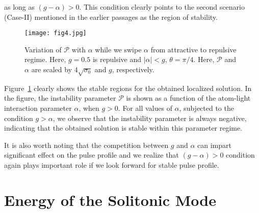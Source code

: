 \documentclass[epj]{svjour}
\begin{document}
as long as $(g-\alpha)>0$. This condition clearly points to the second scenario (Case-II) mentioned in the earlier passages as the region of stability.
\begin{figure}[t]
\centering
\texttt{[image: fig4.jpg]}
\caption{Variation of $\mathcal{P}$ with $\alpha$ while we swipe $\alpha$ from attractive to repulsive regime. Here, $g = 0.5$ is repulsive and $|\alpha|<g$, $\theta=\pi/4$. Here, $\mathcal{P}$ and $\alpha$ are scaled by $4\sqrt{\sigma_{0}}$ and $g$, respectively. }
\label{stability}
\end{figure}
Figure~\ref{stability} clearly shows the stable regions for the obtained localized solution. In the figure, the instability parameter $\mathcal{P}$  is shown as a function of the atom-light interaction parameter $\alpha$, when $g>0$. For all values of $\alpha$, subjected to the condition $g>\alpha$, we observe that the instability parameter is always negative, indicating that the obtained solution is stable within this parameter regime.

It is also worth noting that the competition between $g$ and $\alpha$ can impart significant effect on the pulse profile and we realize that $(g-\alpha)>0$ condition again plays important role if we look forward for stable pulse profile.


\section{Energy of the Solitonic Mode}\label{ene}
\end{document}
